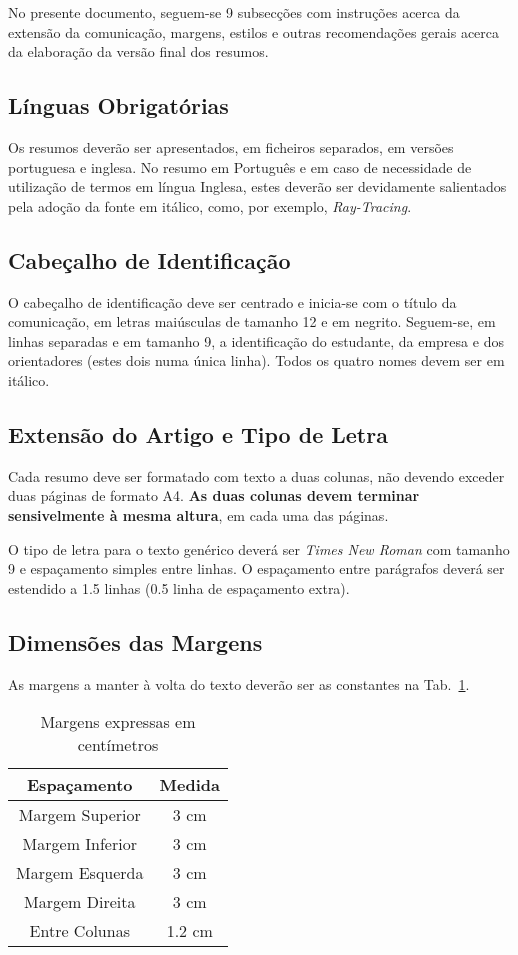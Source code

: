 \documentclass[twocolumn]{article}
\begin{document}
No presente documento, seguem-se 9 subsecções com instruções acerca da extensão da comunicação, margens, estilos e outras recomendações gerais acerca da elaboração da versão final dos resumos.

\subsection{Línguas Obrigatórias}\label{sec:lingua}

Os resumos deverão ser apresentados, em ficheiros separados, em versões portuguesa e inglesa. 
No resumo em Português e em caso de necessidade de utilização de termos em língua Inglesa, estes deverão ser devidamente salientados pela adoção da fonte em itálico, como, por exemplo, \emph{Ray-Tracing}.

\subsection{Cabeçalho de Identificação}

O cabeçalho de identificação deve ser centrado e inicia-se com o título da comunicação, em letras maiúsculas de tamanho 12 e em negrito. 
Seguem-se, em linhas separadas e em tamanho 9, a identificação do estudante, da empresa e dos orientadores (estes dois numa única linha). 
Todos os quatro nomes devem ser em itálico.

\subsection{Extensão do Artigo e Tipo de Letra}

Cada resumo deve ser formatado com texto a duas colunas, não devendo exceder duas páginas de formato A4. 
\textbf{As duas colunas devem terminar sensivelmente à mesma altura}, em cada uma das páginas. 

O tipo de letra para o texto genérico deverá ser \emph{Times New Roman} com tamanho 9 e espaçamento simples entre linhas. 
O espaçamento entre parágrafos deverá ser estendido a 1.5 linhas (0.5 linha de espaçamento extra).

\subsection{Dimensões das Margens}

As margens a manter à volta do texto deverão ser as constantes na Tab.~\ref{tab:medidas}.

\begin{table}[H]
  \centering
  \caption{Margens expressas em centímetros}
\begin{tabular}{c | c}
	\hline
\textbf{Espaçamento} & \textbf{Medida}\\
	\hline
	\hline
        Margem Superior & 3 cm\\
        Margem Inferior & 3 cm\\
        Margem Esquerda & 3 cm\\
        Margem Direita  & 3 cm\\
        Entre Colunas   & 1.2 cm\\
	\hline
\end{tabular}
  \label{tab:medidas}
\end{table}
\end{document}
